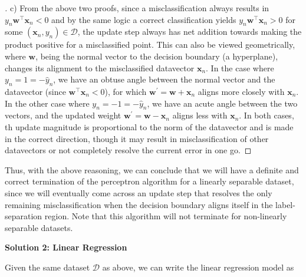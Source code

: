 \documentclass{article}
\renewcommand{\vec}[1]{\mathbf{#1}}
\begin{document}
    \begin{proof}[\unskip\nopunct]
        c) From the above two proofs, since a misclassification always 
        results in $y_n\vec{w}^\intercal \vec{x}_n < 0$ and by the same 
        logic a correct classification yields $y_n\vec{w}^\intercal \vec{x}_n
        > 0$ for some $(\vec{x}_n, y_n) \in \mathcal{D}$, the update step 
        always has net addition towards making the product positive for a 
        misclassified point. This can also be viewed geometrically, where
        $\vec{w}$, being the normal vector to the decision boundary (a 
        hyperplane), changes its alignment to the misclassified datavector 
        $\vec{x}_n$. In the case where $y_n = 1 = -\hat{y}_n$, we have an 
        obtuse angle between the normal vector and the datavector (since $\vec
        {w}^\intercal \vec{x}_n < 0$), for which $\vec{w} ^{\prime} = \vec{w}+
        \vec{x}_n$ aligns more closely with $\vec{x}_n$. In the other case 
        where $y_n = -1 = -\hat{y}_n$, we have an acute angle between the two
        vectors, and the updated weight $\vec{w}^{\prime} =
        \vec{w} - \vec{x}_n$ aligns less with $\vec{x}_n$. In both cases, th
        update magnitude is proportional to the norm of the datavector and 
        is made in the correct direction, though it may result in
        misclassification of other datavectors or not completely 
        resolve the current error in one go.
    \end{proof}

    Thus, with the above reasoning, we can conclude that we will have a
    definite and correct termination of the perceptron algorithm for a 
    linearly separable dataset, since we will eventually come across an
    update step that resolves the only remaining misclassification when the
    decision boundary aligns itself in the label-separation region. Note that
    this algorithm will not terminate for non-linearly separable datasets.
    
    \vspace{0.5cm}

    \textbf{Solution 2: Linear Regression}

    Given the same dataset $\mathcal{D}$ as above, we can write the linear 
    regression model as
\end{document}
